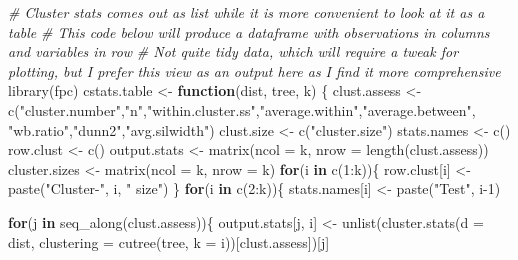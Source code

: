 \documentclass[
]{article}
\newenvironment{Shaded}{\begin{snugshade}}{\end{snugshade}}
\newcommand{\AttributeTok}[1]{\textcolor[rgb]{0.77,0.63,0.00}{#1}}
\newcommand{\CommentTok}[1]{\textcolor[rgb]{0.56,0.35,0.01}{\textit{#1}}}
\newcommand{\ControlFlowTok}[1]{\textcolor[rgb]{0.13,0.29,0.53}{\textbf{#1}}}
\newcommand{\DecValTok}[1]{\textcolor[rgb]{0.00,0.00,0.81}{#1}}
\newcommand{\FunctionTok}[1]{\textcolor[rgb]{0.00,0.00,0.00}{#1}}
\newcommand{\NormalTok}[1]{#1}
\newcommand{\OtherTok}[1]{\textcolor[rgb]{0.56,0.35,0.01}{#1}}
\newcommand{\SpecialCharTok}[1]{\textcolor[rgb]{0.00,0.00,0.00}{#1}}
\newcommand{\StringTok}[1]{\textcolor[rgb]{0.31,0.60,0.02}{#1}}
\begin{document}
\begin{Shaded}
\begin{Highlighting}[]
\CommentTok{\# Cluster stats comes out as list while it is more convenient to look at it as a table}
\CommentTok{\# This code below will produce a dataframe with observations in columns and variables in row}
\CommentTok{\# Not quite tidy data, which will require a tweak for plotting, but I prefer this view as an output here as I find it more comprehensive }
\FunctionTok{library}\NormalTok{(fpc)}
\NormalTok{cstats.table }\OtherTok{\textless{}{-}} \ControlFlowTok{function}\NormalTok{(dist, tree, k) \{}
\NormalTok{  clust.assess }\OtherTok{\textless{}{-}} \FunctionTok{c}\NormalTok{(}\StringTok{"cluster.number"}\NormalTok{,}\StringTok{"n"}\NormalTok{,}\StringTok{"within.cluster.ss"}\NormalTok{,}\StringTok{"average.within"}\NormalTok{,}\StringTok{"average.between"}\NormalTok{,}
                    \StringTok{"wb.ratio"}\NormalTok{,}\StringTok{"dunn2"}\NormalTok{,}\StringTok{"avg.silwidth"}\NormalTok{)}
\NormalTok{  clust.size }\OtherTok{\textless{}{-}} \FunctionTok{c}\NormalTok{(}\StringTok{"cluster.size"}\NormalTok{)}
\NormalTok{  stats.names }\OtherTok{\textless{}{-}} \FunctionTok{c}\NormalTok{()}
\NormalTok{  row.clust }\OtherTok{\textless{}{-}} \FunctionTok{c}\NormalTok{()}
\NormalTok{  output.stats }\OtherTok{\textless{}{-}} \FunctionTok{matrix}\NormalTok{(}\AttributeTok{ncol =}\NormalTok{ k, }\AttributeTok{nrow =} \FunctionTok{length}\NormalTok{(clust.assess))}
\NormalTok{  cluster.sizes }\OtherTok{\textless{}{-}} \FunctionTok{matrix}\NormalTok{(}\AttributeTok{ncol =}\NormalTok{ k, }\AttributeTok{nrow =}\NormalTok{ k)}
  \ControlFlowTok{for}\NormalTok{(i }\ControlFlowTok{in} \FunctionTok{c}\NormalTok{(}\DecValTok{1}\SpecialCharTok{:}\NormalTok{k))\{}
\NormalTok{    row.clust[i] }\OtherTok{\textless{}{-}} \FunctionTok{paste}\NormalTok{(}\StringTok{"Cluster{-}"}\NormalTok{, i, }\StringTok{" size"}\NormalTok{)}
\NormalTok{  \}}
  \ControlFlowTok{for}\NormalTok{(i }\ControlFlowTok{in} \FunctionTok{c}\NormalTok{(}\DecValTok{2}\SpecialCharTok{:}\NormalTok{k))\{}
\NormalTok{    stats.names[i] }\OtherTok{\textless{}{-}} \FunctionTok{paste}\NormalTok{(}\StringTok{"Test"}\NormalTok{, i}\DecValTok{{-}1}\NormalTok{)}
    
    \ControlFlowTok{for}\NormalTok{(j }\ControlFlowTok{in} \FunctionTok{seq\_along}\NormalTok{(clust.assess))\{}
\NormalTok{      output.stats[j, i] }\OtherTok{\textless{}{-}} \FunctionTok{unlist}\NormalTok{(}\FunctionTok{cluster.stats}\NormalTok{(}\AttributeTok{d =}\NormalTok{ dist, }\AttributeTok{clustering =} \FunctionTok{cutree}\NormalTok{(tree, }\AttributeTok{k =}\NormalTok{ i))[clust.assess])[j]}
      

\end{Highlighting}
\end{Shaded}
\end{document}
